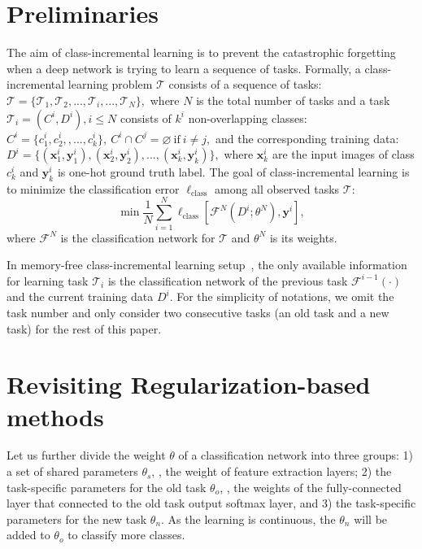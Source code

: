 \documentclass[10pt,twocolumn,letterpaper]{article}
\begin{document}
\section{Preliminaries}
The aim of class-incremental learning is to prevent the catastrophic forgetting when a deep network is trying to learn a sequence of tasks. Formally, a class-incremental learning problem $\mathcal{T}$ consists of a sequence of tasks: $    \mathcal{T} = \{\mathcal{T}_1, \mathcal{T}_2, ..., \mathcal{T}_i, ..., \mathcal{T}_N\},$
where $N$ is the total number of tasks and a task $\mathcal{T}_i = (C^i, D^i), i\leq N$ consists of $k^i$ non-overlapping classes: $ C^i = \{c_1^i,c_2^i,,...,c_k^i\}, \ C^i\cap C^j=\varnothing \ \text{if} \ i\neq j,$
and the corresponding training data: $    D^i=\{(\mathbf{x}_1^i, \mathbf{y}_1^i), (\mathbf{x}_2^i, \mathbf{y}_2^i), ..., (\mathbf{x}_k^i, \mathbf{y}_k^i)\},$
where $\mathbf{x}_k^i$ are the input images of class $c_k^i$ and $\mathbf{y}_k^i$ is one-hot ground truth label. The goal of class-incremental learning is to minimize the classification error $\ell_\text{class}$ among all observed tasks $\mathcal{T}$:
\begin{equation}
    \min \frac{1}{N}\sum_{i=1}^N \ell_\text{class}[\mathcal{F}^N(D^i;\theta^N), \mathbf{y}^i],
\end{equation}
where $\mathcal{F}^N$ is the classification network for $\mathcal{T}$ and $\theta^N$ is its weights.

In memory-free class-incremental learning setup~\cite{dhar2019learning}, the only available information for learning task $\mathcal{T}_i$ is the classification network of the previous task $\mathcal{F}^{i-1}(\cdot)$ and the current training data $D^i$.
For the simplicity of notations, we omit the task number and only consider two consecutive tasks (an old task and a new task) for the rest of this paper.

\section{Revisiting Regularization-based methods}

Let us further divide the weight $\theta$ of a classification network into three groups: 1) a set of shared parameters $\theta_s$, \ie, the weight of feature extraction layers; 2) the task-specific parameters for the old task $\theta_{o}$,  \ie, the weights of the fully-connected layer that connected to the old task output softmax layer, and 3) the task-specific parameters for the new task $\theta_{n}$. As the learning is continuous, the $\theta_{n}$ will be added to $\theta_{o}$ to classify more classes.
\end{document}
